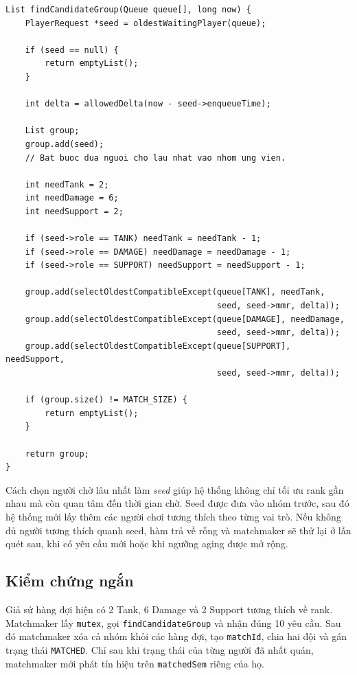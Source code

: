 \begin{lstlisting}
List findCandidateGroup(Queue queue[], long now) {
    PlayerRequest *seed = oldestWaitingPlayer(queue);

    if (seed == null) {
        return emptyList();
    }

    int delta = allowedDelta(now - seed->enqueueTime);

    List group;
    group.add(seed);
    // Bat buoc dua nguoi cho lau nhat vao nhom ung vien.

    int needTank = 2;
    int needDamage = 6;
    int needSupport = 2;

    if (seed->role == TANK) needTank = needTank - 1;
    if (seed->role == DAMAGE) needDamage = needDamage - 1;
    if (seed->role == SUPPORT) needSupport = needSupport - 1;

    group.add(selectOldestCompatibleExcept(queue[TANK], needTank,
                                           seed, seed->mmr, delta));
    group.add(selectOldestCompatibleExcept(queue[DAMAGE], needDamage,
                                           seed, seed->mmr, delta));
    group.add(selectOldestCompatibleExcept(queue[SUPPORT], needSupport,
                                           seed, seed->mmr, delta));

    if (group.size() != MATCH_SIZE) {
        return emptyList();
    }

    return group;
}
\end{lstlisting}

Cách chọn người chờ lâu nhất làm \textit{seed} giúp hệ thống không chỉ tối ưu
rank gần nhau mà còn quan tâm đến thời gian chờ. Seed được đưa vào nhóm trước,
sau đó hệ thống mới lấy thêm các người chơi tương thích theo từng vai trò. Nếu
không đủ người tương thích quanh seed, hàm trả về rỗng và matchmaker sẽ thử lại
ở lần quét sau, khi có yêu cầu mới hoặc khi ngưỡng aging được mở rộng.

\subsection{Kiểm chứng ngắn}

Giả sử hàng đợi hiện có 2 Tank, 6 Damage và 2 Support tương thích về rank.
Matchmaker lấy \texttt{mutex}, gọi \texttt{findCandidateGroup} và nhận đúng 10
yêu cầu. Sau đó matchmaker xóa cả nhóm khỏi các hàng đợi, tạo
\texttt{matchId}, chia hai đội và gán trạng thái \texttt{MATCHED}. Chỉ sau khi
trạng thái của từng người đã nhất quán, matchmaker mới phát tín hiệu trên
\texttt{matchedSem} riêng của họ.

